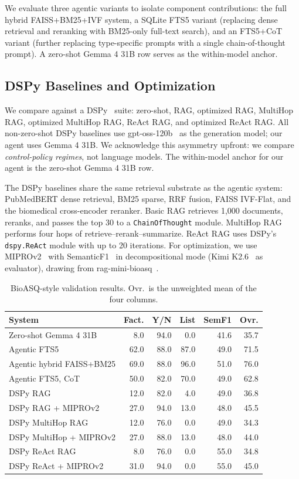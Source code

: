 \documentclass[sigconf,anonymous,review]{acmart}
\begin{document}
We evaluate three agentic variants to isolate component contributions: the full hybrid FAISS+BM25+IVF system, a SQLite FTS5 variant (replacing dense retrieval and reranking with BM25-only full-text search), and an FTS5+CoT variant (further replacing type-specific prompts with a single chain-of-thought prompt).
A zero-shot Gemma 4 31B row serves as the within-model anchor.

\subsection{DSPy Baselines and Optimization}

We compare against a DSPy~\cite{khattab2023dspy} suite: zero-shot, RAG, optimized RAG, MultiHop RAG, optimized MultiHop RAG, ReAct RAG, and optimized ReAct RAG.
All non-zero-shot DSPy baselines use gpt-oss-120b~\cite{openai2025gptoss} as the generation model; our agent uses Gemma 4 31B.
We acknowledge this asymmetry upfront: we compare \emph{control-policy regimes}, not language models.
The within-model anchor for our agent is the zero-shot Gemma 4 31B row.

The DSPy baselines share the same retrieval substrate as the agentic system: PubMedBERT dense retrieval, BM25 sparse, RRF fusion, FAISS IVF-Flat, and the biomedical cross-encoder reranker.
Basic RAG retrieves 1,000 documents, reranks, and passes the top 30 to a \texttt{ChainOfThought} module.
MultiHop RAG performs four hops of retrieve--rerank--summarize.
ReAct RAG uses DSPy's \texttt{dspy.ReAct} module with up to 20 iterations.
For optimization, we use MIPROv2~\cite{dspy2026mipro,opsahl2024mipro} with SemanticF1~\cite{dspy2026semanticf1} in decompositional mode (Kimi K2.6~\cite{moonshot2026} as evaluator), drawing from rag-mini-bioasq~\cite{ragdatasets2024}.

\begin{table}[t]
\caption{BioASQ-style validation results. Ovr.\ is the unweighted mean of the four columns.}
\label{tab:results}
\small
\begin{tabular}{lrrrrr}
\toprule
System & Fact. & Y/N & List & SemF1 & Ovr. \\
\midrule
Zero-shot Gemma 4 31B & 8.0 & 94.0 & 0.0 & 41.6 & 35.7 \\
Agentic FTS5 & 62.0 & 88.0 & 87.0 & 49.0 & 71.5 \\
Agentic hybrid FAISS+BM25 & 69.0 & 88.0 & 96.0 & 51.0 & 76.0 \\
Agentic FTS5, CoT & 50.0 & 82.0 & 70.0 & 49.0 & 62.8 \\
\midrule
DSPy RAG & 12.0 & 82.0 & 4.0 & 49.0 & 36.8 \\
DSPy RAG + MIPROv2 & 27.0 & 94.0 & 13.0 & 48.0 & 45.5 \\
DSPy MultiHop RAG & 12.0 & 76.0 & 0.0 & 49.0 & 34.3 \\
DSPy MultiHop + MIPROv2 & 27.0 & 88.0 & 13.0 & 48.0 & 44.0 \\
DSPy ReAct RAG & 8.0 & 76.0 & 0.0 & 55.0 & 34.8 \\
DSPy ReAct + MIPROv2 & 31.0 & 94.0 & 0.0 & 55.0 & 45.0 \\
\bottomrule
\end{tabular}
\end{table}
\end{document}
